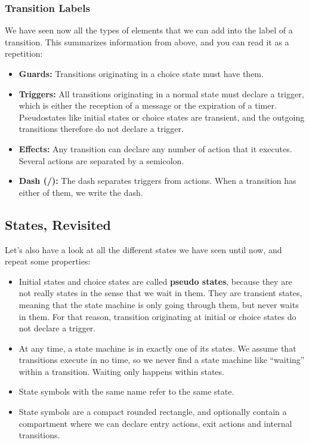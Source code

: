 \documentclass[10pt, twoside, twocolumn]{book}
\providecommand{\tightlist}{%
  \setlength{\itemsep}{0pt}\setlength{\parskip}{0pt}}
\begin{document}
\hypertarget{transition-labels}{%
\subsubsection{Transition Labels}\label{transition-labels}}

We have seen now all the types of elements that we can add into the
label of a transition. This summarizes information from above, and you
can read it as a repetition:

\begin{itemize}
\tightlist
\item
  \textbf{Guards:} Transitions originating in a choice state must have
  them.
\item
  \textbf{Triggers:} All transitions originating in a normal state must
  declare a trigger, which is either the reception of a message or the
  expiration of a timer. Pseudostates like initial states or choice
  states are transient, and the outgoing transitions therefore do not
  declare a trigger.
\item
  \textbf{Effects:} Any transition can declare any number of action that
  it executes. Several actions are separated by a semicolon.
\item
  \textbf{Dash (/):} The dash separates triggers from actions. When a
  transition has either of them, we write the dash.
\end{itemize}

\hypertarget{states-revisited}{%
\subsection{States, Revisited}\label{states-revisited}}

Let's also have a look at all the different states we have seen until
now, and repeat some properties:

\begin{itemize}
\tightlist
\item
  Initial states and choice states are called \textbf{pseudo states},
  because they are not really states in the sense that we wait in them.
  They are transient states, meaning that the state machine is only
  going through them, but never waits in them. For that reason,
  transition originating at initial or choice states do not declare a
  trigger.
\item
  At any time, a state machine is in exactly one of its states. We
  assume that transitions execute in no time, so we never find a state
  machine like ``waiting'' within a transition. Waiting only happens
  within states.
\item
  State symbols with the same name refer to the same state.
\item
  State symbols are a compact rounded rectangle, and optionally contain
  a compartment where we can declare entry actions, exit actions and
  internal transitions.
\end{itemize}
\end{document}
